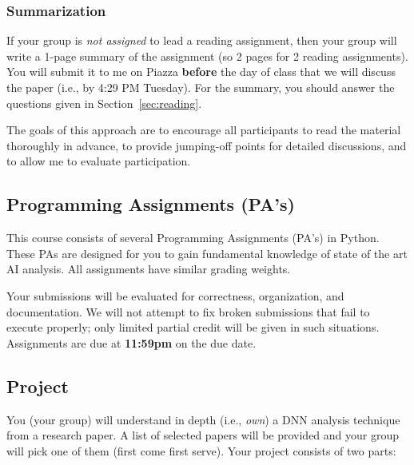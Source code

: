\documentclass[11pt]{article}
\begin{document}
\subsubsection{Summarization} 

If your group is \emph{not assigned} to lead a reading assignment, then your group will write a 1-page summary of the assignment (so 2 pages for 2 reading assignments). You will submit it to me on Piazza \textbf{before} the day of class that we will discuss the paper (i.e., by 4:29 PM Tuesday).  For the summary, you should answer the questions given in Section~\ref{sec:reading}.

The goals of this approach are to encourage all participants to read the material thoroughly in advance, to provide jumping-off points for detailed discussions, and to allow me to evaluate participation.

\subsection{Programming Assignments (PA's)}

This course consists of several Programming Assignments (PA's) in Python. These PAs are designed for you to gain fundamental knowledge of state of the art AI analysis. All assignments have similar grading weights.

Your submissions will be evaluated for correctness,
organization, and documentation. We will not attempt to fix broken
submissions that fail to execute properly; only limited partial credit will be given in such situations. Assignments are due at \textbf{11:59pm} on the due date.

    

\subsection{Project}
\label{sec:org6da900e}

You (your group) will understand in depth (i.e., \emph{own}) a DNN analysis technique from a research paper. A list of selected papers will be provided and your group will pick one of them (first come first serve).  Your project consists of two parts:
\end{document}
